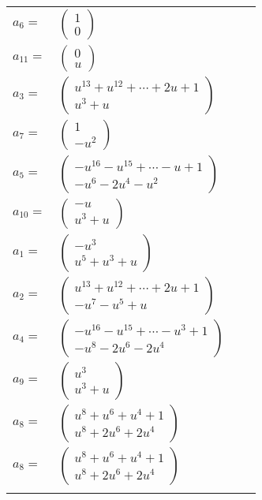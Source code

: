 \documentclass[1p]{elsarticle_modified}
\theoremstyle{definition}
\begin{document}
\begin{tabular}{m{7pt} m{180pt} m{7pt} m{180pt} }
\flushright $a_{6}=$&$\begin{pmatrix}1\\0\end{pmatrix}$ \\
\flushright $a_{11}=$&$\begin{pmatrix}0\\u\end{pmatrix}$ \\
\flushright $a_{3}=$&$\begin{pmatrix}u^{13}+u^{12}+\cdots+2 u+1\\u^3+u\end{pmatrix}$ \\
\flushright $a_{7}=$&$\begin{pmatrix}1\\- u^2\end{pmatrix}$ \\
\flushright $a_{5}=$&$\begin{pmatrix}- u^{16}- u^{15}+\cdots- u+1\\- u^6-2 u^4- u^2\end{pmatrix}$ \\
\flushright $a_{10}=$&$\begin{pmatrix}- u\\u^3+u\end{pmatrix}$ \\
\flushright $a_{1}=$&$\begin{pmatrix}- u^3\\u^5+u^3+u\end{pmatrix}$ \\
\flushright $a_{2}=$&$\begin{pmatrix}u^{13}+u^{12}+\cdots+2 u+1\\- u^7- u^5+u\end{pmatrix}$ \\
\flushright $a_{4}=$&$\begin{pmatrix}- u^{16}- u^{15}+\cdots- u^3+1\\- u^8-2 u^6-2 u^4\end{pmatrix}$ \\
\flushright $a_{9}=$&$\begin{pmatrix}u^3\\u^3+u\end{pmatrix}$ \\
\flushright $a_{8}=$&$\begin{pmatrix}u^8+u^6+u^4+1\\u^8+2 u^6+2 u^4\end{pmatrix}$\\ \flushright $a_{8}=$&$\begin{pmatrix}u^8+u^6+u^4+1\\u^8+2 u^6+2 u^4\end{pmatrix}$\\&\end{tabular}
\end{document}

